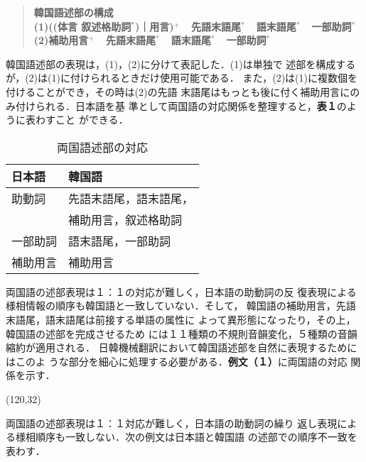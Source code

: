 \vspace{3mm}
\begin{quote}
{\bf 
韓国語述部の構成\\
(1)((体言  叙述格助詞{\footnotesize ${^{*}}$})｜用言){\footnotesize ${^{+}}$}\ \ 
先語末語尾{\footnotesize ${^{*}}$}\ \ 語末語尾{\footnotesize ${^{*}}$}\ \ 
一部助詞{\footnotesize ${^{*}}$}\\
(2)補助用言{\footnotesize ${^{+}}$}\ \ 先語末語尾{\footnotesize ${^{*}}$}\ \ 
語末語尾{\footnotesize ${^{*}}$}\ \ 一部助詞{\footnotesize ${^{*}}$}
}
\end{quote}
\vspace{3mm}

韓国語述部の表現は，(1)，(2)に分けて表記した．(1)は単独で
述部を構成するが，(2)は(1)に付けられるときだけ使用可能である．
また，(2)は(1)に複数個を付けることができ，その時は(2)の先語
末語尾はもっとも後に付く補助用言にのみ付けられる．日本語を基
準として両国語の対応関係を整理すると，{\bf 表１}のように表わすこと
ができる．

\begin{table}[htb]
\caption{両国語述部の対応}
\begin{center}
\begin{tabular}{|l|l|} \hline
{\bf 日本語} & {\bf 韓国語} \\ \hline
助動詞 \hspace{20mm}
& 先語末語尾，語末語尾，\\
& 補助用言，叙述格助詞 \\ \hline
一部助詞 & 語末語尾，一部助詞 \\ \hline
補助用言 & 補助用言 \\ \hline
\end{tabular}
\end{center}
\end{table}


両国語の述部表現は１：１の対応が難しく，日本語の助動詞の反
復表現による様相情報の順序も韓国語と一致していない．そして，
韓国語の補助用言，先語末語尾，語末語尾は前接する単語の属性に
よって異形態になったり，その上，韓国語の述部を完成させるため
には１１種類の不規則音韻変化，５種類の音韻縮約が適用される．
日韓機械翻訳において韓国語述部を自然に表現するためにはこのよ
うな部分を細心に処理する必要がある．{\bf 例文（１）}に両国語の対応
関係を示す．

\atari(120,32)

両国語の述部表現は１：１対応が難しく，日本語の助動詞の繰り
返し表現による様相順序も一致しない．次の例文は日本語と韓国語
の述部での順序不一致を表わす．

